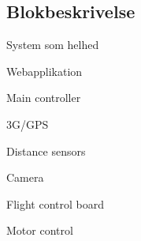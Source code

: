 \subsection{Blokbeskrivelse}

System som helhed

Webapplikation

Main controller

3G/GPS

Distance sensors

Camera

Flight control board

Motor control